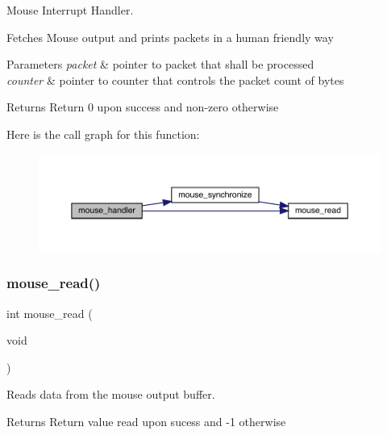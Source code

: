 Mouse Interrupt Handler. 

Fetches Mouse output and prints packets in a human friendly way


\begin{DoxyParams}{Parameters}
{\em packet} & pointer to packet that shall be processed \\
\hline
{\em counter} & pointer to counter that controls the packet count of bytes\\
\hline
\end{DoxyParams}
\begin{DoxyReturn}{Returns}
Return 0 upon success and non-\/zero otherwise 
\end{DoxyReturn}
Here is the call graph for this function\+:\nopagebreak
\begin{figure}[H]
\begin{center}
\leavevmode
\includegraphics[width=350pt]{group__mouse_gab5168a5f260c8e28f0f75db8a35cdb98_cgraph}
\end{center}
\end{figure}
\hypertarget{group__mouse_gaaff93ce65c5bddd94904122f0e336233}{}\label{group__mouse_gaaff93ce65c5bddd94904122f0e336233} 
\subsubsection{\texorpdfstring{mouse\+\_\+read()}{mouse\_read()}}
{\footnotesize\ttfamily int mouse\+\_\+read (\begin{DoxyParamCaption}\item[{void}]{ }\end{DoxyParamCaption})}



Reads data from the mouse output buffer. 

\begin{DoxyReturn}{Returns}
Return value read upon sucess and -\/1 otherwise 
\end{DoxyReturn}
\hypertarget{group__mouse_ga51e6ee02a5c0a7e618abde7250cd0841}{}\label{group__mouse_ga51e6ee02a5c0a7e618abde7250cd0841} 

